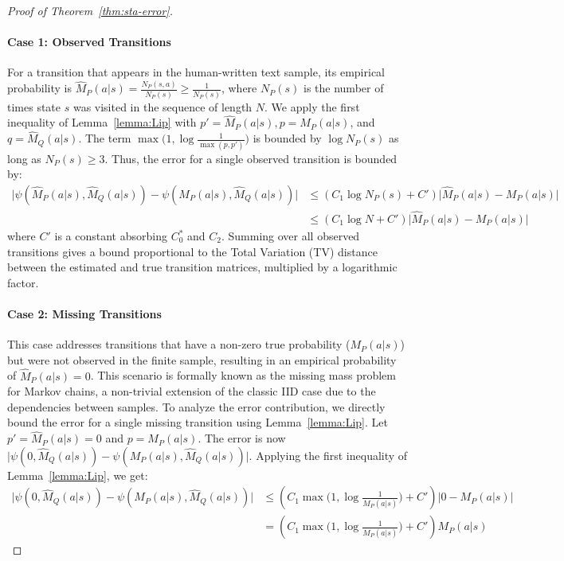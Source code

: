\documentclass{article}
\theoremstyle{plain}
\theoremstyle{definition}
\theoremstyle{remark}
\begin{document}
\begin{proof}[Proof of Theorem~\ref{thm:sta-error}]
\paragraph{Case 1: Observed Transitions} For a transition that appears in the human-written text sample, its empirical probability is $\hat{M}_P(a|s) = \frac{N_P(s,a)}{N_P(s)} \geq \frac{1}{N_P(s)}$, where $N_P(s)$ is the number of times state $s$ was visited in the sequence of length $N$. We apply the first inequality of Lemma~\ref{lemma:Lip} with $p' = \hat M_P(a|s), p=M_P(a|s)$, and $q=\hat M_Q(a|s)$. The term $\max\big(1,\log \frac{1}{\max (p,p')}\big)$ is bounded by $\log N_P(s)$ as long as $N_P(s)\geq 3$. Thus, the error for a single observed transition is bounded by:
\begin{align}
    \big|\psi (\hat M_P(a|s),\hat M_Q(a|s))-\psi ( M_P(a|s),\hat M_Q(a|s))  \big|&\leq (C_1\log N_P(s)+C')\big| \hat M_P(a|s) -M_P(a|s)  \big| \\
    &\leq (C_1\log N+C')\big| \hat M_P(a|s) -M_P(a|s)  \big|
\end{align}
where $C'$ is a constant absorbing $C_0^*$ and $C_2$. Summing over all observed transitions gives a bound proportional to the Total Variation (TV) distance between the estimated and true transition matrices, multiplied by a logarithmic factor.
\paragraph{Case 2: Missing Transitions} This case addresses transitions that have a non-zero true probability ($M_P(a|s)$) but were not observed in the finite sample, resulting in an empirical probability of $\hat M_P(a|s)=0$. This scenario is formally known as the missing mass problem for Markov chains, a non-trivial extension of the classic IID case due to the dependencies between samples. To analyze the error contribution, we directly bound the error for a single missing transition using Lemma~\ref{lemma:Lip}. Let $p'= \hat M_P(a|s)=0$ and $p=M_P(a|s)$. The error is now $\big|\psi (0 ,\hat M_Q(a|s))-\psi ( M_P(a|s),\hat M_Q(a|s))  \big|$. Applying the first inequality of Lemma~\ref{lemma:Lip}, we get:
\begin{align}
    \big|\psi (0 ,\hat M_Q(a|s))-\psi ( M_P(a|s),\hat M_Q(a|s))  \big| &\leq  (C_1\max \bigg(1,\log \frac{1}{ M_P(a|s)}\bigg)+C')\big| 0 -M_P(a|s)  \big| 
    \\ &= (C_1\max \bigg(1,\log \frac{1}{ M_P(a|s)}\bigg)+C')M_P(a|s) 
\end{align}


\end{proof}
\end{document}
